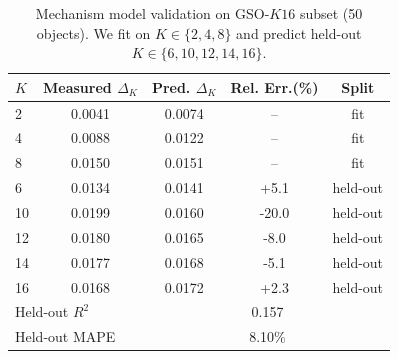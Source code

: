 \begin{table}[t]
  \centering
  \caption{Mechanism model validation on GSO-$K16$ subset (50 objects). We fit on $K\in\{2,4,8\}$ and predict held-out $K\in\{6,10,12,14,16\}$.}
  \label{tab:k_model_validation}
  \begin{tabular}{lcccc}
    \toprule
    $K$ & Measured $\Delta_K$ & Pred. $\Delta_K$ & Rel. Err.(\%) & Split \\
    \midrule
    2  & 0.0041 & 0.0074 & -- & fit \\
    4  & 0.0088 & 0.0122 & -- & fit \\
    8  & 0.0150 & 0.0151 & -- & fit \\
    6  & 0.0134 & 0.0141 & +5.1 & held-out \\
    10 & 0.0199 & 0.0160 & -20.0 & held-out \\
    12 & 0.0180 & 0.0165 & -8.0 & held-out \\
    14 & 0.0177 & 0.0168 & -5.1 & held-out \\
    16 & 0.0168 & 0.0172 & +2.3 & held-out \\
    \midrule
    \multicolumn{2}{l}{Held-out $R^2$} & \multicolumn{3}{c}{0.157} \\
    \multicolumn{2}{l}{Held-out MAPE} & \multicolumn{3}{c}{8.10\%} \\
    \bottomrule
  \end{tabular}
\end{table}
